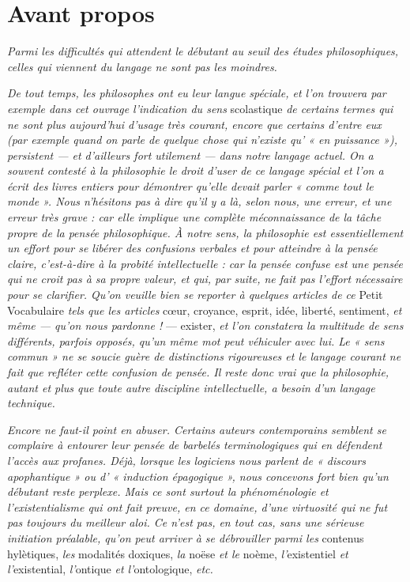 
\section{Avant propos}

{\it Parmi les difficultés qui attendent le débutant au seuil des études philosophiques,
celles qui viennent du langage ne sont pas les moindres.}

{\it De tout temps, les philosophes ont eu leur langue spéciale, et l’on trouvera
par exemple dans cet ouvrage l'indication du sens} scolastique {\it de certains
termes qui ne sont plus aujourd’hui d'usage très courant, encore que certains
d'entre eux (par exemple quand on parle de quelque chose qui n'existe qu’ « en
puissance »), persistent — et d’ailleurs fort utilement — dans notre langage
actuel. On a souvent contesté à la philosophie le droit d’user de ce langage
spécial et l’on a écrit des livres entiers pour démontrer qu’elle devait parler
« comme tout le monde ». Nous n’hésitons pas à dire qu’il y a là, selon nous, une
erreur, et une erreur très grave : car elle implique une complète méconnaissance
de la tâche propre de la pensée philosophique. À notre sens, la philosophie
est essentiellement un effort pour se libérer des confusions verbales et pour
atteindre à la pensée claire, c’est-à-dire à la probité intellectuelle : car la
pensée confuse est une pensée qui ne croit pas à sa propre valeur, et qui, par
suite, ne fait pas l'effort nécessaire pour se clarifier. Qu’on veuille bien se
reporter à quelques articles de ce} Petit Vocabulaire {\it tels que les articles} cœur,
croyance, esprit, idée, liberté, sentiment, {\it et même — qu’on nous pardonne !}
— exister, {\it et l’on constatera la multitude de sens différents, parfois opposés,
qu'un même mot peut véhiculer avec lui. Le « sens commun » ne se soucie
guère de distinctions rigoureuses et le langage courant ne fait que refléter
cette confusion de pensée. Il reste donc vrai que la philosophie, autant et plus
que toute autre discipline intellectuelle, a besoin d’un langage technique.}

{\it Encore ne faut-il point en abuser. Certains auteurs contemporains semblent
se complaire à entourer leur pensée de barbelés terminologiques qui en défendent
l’accès aux profanes. Déjà, lorsque les logiciens nous parlent de « discours
apophantique » ou d’ « induction épagogique », nous concevons fort bien
qu'un débutant reste perplexe. Mais ce sont surtout la phénoménologie et
l'existentialisme qui ont fait preuve, en ce domaine, d’une virtuosité qui ne
fut pas toujours du meilleur aloi. Ce n’est pas, en tout cas, sans une sérieuse
initiation préalable, qu'on peut arriver à se débrouiller parmi les} contenus
hylètiques, {\it les} modalités doxiques, {\it la} noëse {\it et le} noème, {\it l’}existentiel {\it et
l'}existential, {\it l'}ontique {\it et l'}ontologique, {\it etc.}

